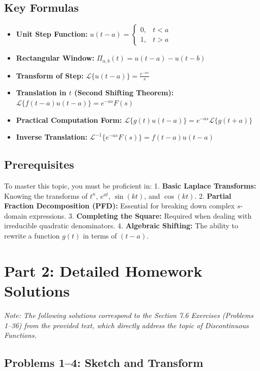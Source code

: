 \documentclass[11pt, letterpaper]{article}
\theoremstyle{definition}
\theoremstyle{remark}
\newcommand{\Lap}{\mathcal{L}}
\begin{document}
\subsection{Key Formulas}
\begin{itemize}
    \item \textbf{Unit Step Function:} $u(t-a) = \begin{cases} 0, & t < a \\ 1, & t > a \end{cases}$
    \item \textbf{Rectangular Window:} $\Pi_{a,b}(t) = u(t-a) - u(t-b)$
    \item \textbf{Transform of Step:} $\Lap\{u(t-a)\} = \frac{e^{-as}}{s}$
    \item \textbf{Translation in $t$ (Second Shifting Theorem):} $\Lap\{f(t-a)u(t-a)\} = e^{-as}F(s)$
    \item \textbf{Practical Computation Form:} $\Lap\{g(t)u(t-a)\} = e^{-as}\Lap\{g(t+a)\}$
    \item \textbf{Inverse Translation:} $\Lap^{-1}\{e^{-as}F(s)\} = f(t-a)u(t-a)$
\end{itemize}

\subsection{Prerequisites}
To master this topic, you must be proficient in:
1. \textbf{Basic Laplace Transforms:} Knowing the transforms of $t^n$, $e^{at}$, $\sin(kt)$, and $\cos(kt)$.
2. \textbf{Partial Fraction Decomposition (PFD):} Essential for breaking down complex $s$-domain expressions.
3. \textbf{Completing the Square:} Required when dealing with irreducible quadratic denominators.
4. \textbf{Algebraic Shifting:} The ability to rewrite a function $g(t)$ in terms of $(t-a)$.

\newpage
\section{Part 2: Detailed Homework Solutions}
\textit{Note: The following solutions correspond to the Section 7.6 Exercises (Problems 1–36) from the provided text, which directly address the topic of Discontinuous Functions.}

\subsection{Problems 1–4: Sketch and Transform}
\end{document}
